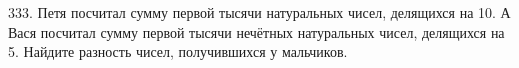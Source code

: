 333. Петя посчитал сумму первой тысячи натуральных чисел, делящихся на 10. А Вася посчитал сумму первой тысячи нечётных натуральных чисел, делящихся на 5. Найдите разность чисел, получившихся у мальчиков.\\
